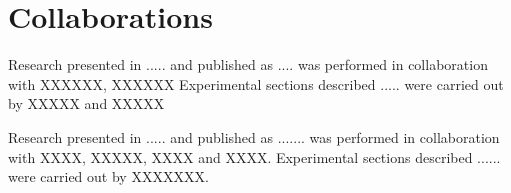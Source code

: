 





\chapter*{Collaborations}
\thispagestyle{empty}


Research presented in ..... and published as ....
was performed in collaboration with 
XXXXXX, XXXXXX 
Experimental sections described ..... were carried out by XXXXX and XXXXX 

Research presented in ..... and published as .......
was performed in collaboration with XXXX, XXXXX, XXXX and XXXX.
Experimental sections described ...... were carried out by XXXXXXX.





